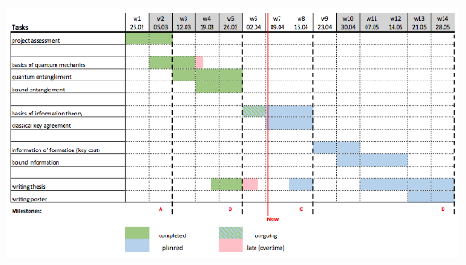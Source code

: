 \documentclass{article}
\begin{document}
\centerline{
	\includegraphics[scale=0.5]{gantt-5.png}
}
\pagebreak
%
%	
%	
%	
%	
%	
%	
%	
%
\end{document}
